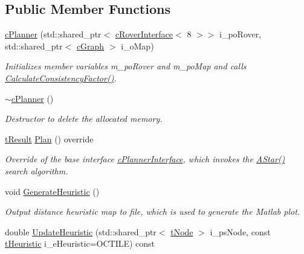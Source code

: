 \subsection*{Public Member Functions}
\begin{DoxyCompactItemize}
\item 
\mbox{\hyperlink{classplanner_1_1c_planner_a381d86c14532f65cf21cb80b4c64ce0e}{c\+Planner}} (std\+::shared\+\_\+ptr$<$ \mbox{\hyperlink{classplanner_1_1c_rover_interface}{c\+Rover\+Interface}}$<$ 8 $>$$>$ i\+\_\+po\+Rover, std\+::shared\+\_\+ptr$<$ \mbox{\hyperlink{classplanner_1_1c_graph}{c\+Graph}} $>$ i\+\_\+o\+Map)
\begin{DoxyCompactList}\small\item\em Initializes member variables m\+\_\+po\+Rover and m\+\_\+po\+Map and calls \mbox{\hyperlink{classplanner_1_1c_planner_a2e5a745f83f903662eff914d8beddb5e}{Calculate\+Consistency\+Factor()}}. \end{DoxyCompactList}\item 
\mbox{\label{classplanner_1_1c_planner_aa9ae1109d3c4b7ac19aef2616547654e}} 
\mbox{\hyperlink{classplanner_1_1c_planner_aa9ae1109d3c4b7ac19aef2616547654e}{$\sim$c\+Planner}} ()
\begin{DoxyCompactList}\small\item\em Destructor to delete the allocated memory. \end{DoxyCompactList}\item 
\mbox{\hyperlink{structt_result}{t\+Result}} \mbox{\hyperlink{classplanner_1_1c_planner_a21230c015260b9fc34ad2f239592470e}{Plan}} () override
\begin{DoxyCompactList}\small\item\em Override of the base interface \mbox{\hyperlink{classplanner_1_1c_planner_interface}{c\+Planner\+Interface}}, which invokes the \mbox{\hyperlink{classplanner_1_1c_planner_a341e70531266f023ac9461d18979d1ef}{A\+Star()}} search algorithm. \end{DoxyCompactList}\item 
void \mbox{\hyperlink{classplanner_1_1c_planner_a1a4650050656545744796296a653d388}{Generate\+Heuristic}} ()
\begin{DoxyCompactList}\small\item\em Output distance heuristic map to file, which is used to generate the Matlab plot. \end{DoxyCompactList}\item 
double \mbox{\hyperlink{classplanner_1_1c_planner_ab7cc7c2666de2e49f745901080aac147}{Update\+Heuristic}} (std\+::shared\+\_\+ptr$<$ \mbox{\hyperlink{structplanner_1_1t_node}{t\+Node}} $>$ i\+\_\+ps\+Node, const \mbox{\hyperlink{classplanner_1_1c_planner_a7f6dc4cbb69dd1ede14a67b0a7bd425b}{t\+Heuristic}} i\+\_\+e\+Heuristic=O\+C\+T\+I\+LE) const
$$
\end{DoxyCompactItemize}

